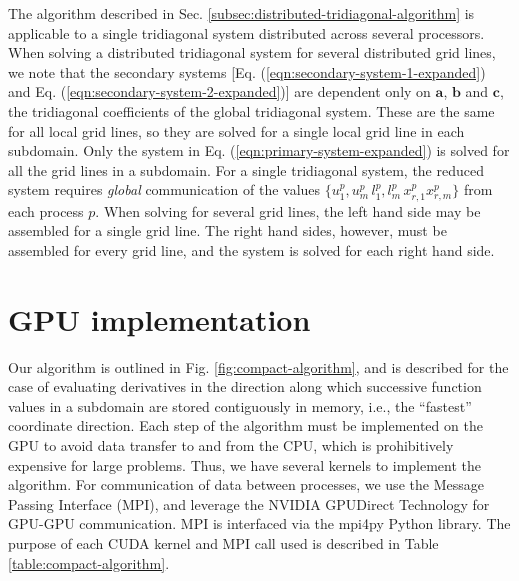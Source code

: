 The algorithm described in
Sec. \ref{subsec:distributed-tridiagonal-algorithm}
is applicable to a single tridiagonal system distributed
across several processors.
When solving a distributed tridiagonal system
for several distributed grid lines,
we note that
the secondary systems
[Eq. (\ref{eqn:secondary-system-1-expanded}) and
 Eq. (\ref{eqn:secondary-system-2-expanded})]
are dependent only on $\bm{a}$, $\bm{b}$ and $\bm{c}$,
the tridiagonal coefficients of the global tridiagonal system.
These are the same for all local grid lines,
so they are solved for a single local grid line in each subdomain.
Only the system in Eq. (\ref{eqn:primary-system-expanded})
is solved for all the grid lines in a subdomain.
For a single tridiagonal system,
the reduced system requires \emph{global} communication
of the values $\{u^p_1, u^p_m\, l^p_1, l^p_m\, x^p_{r,1} x^p_{r,m}\}$
from each process $p$.
When solving for several grid lines,
the left hand side may be assembled for a single grid line.
The right hand sides, however, must be assembled for every grid line,
and the system is solved for each right hand side.

\section{GPU implementation}

Our algorithm is outlined in Fig. \ref{fig:compact-algorithm},
and is described for the case of evaluating derivatives
in the direction along which successive
function values in a subdomain are stored contiguously in memory,
i.e., the ``fastest'' coordinate direction.
Each step of the algorithm must be implemented on the GPU
to avoid data transfer to and from the CPU,
which is prohibitively expensive for large problems.
Thus, we have several kernels to implement the algorithm.
For communication of data between processes,
we use the Message Passing Interface (MPI),
and leverage the NVIDIA GPUDirect Technology
for GPU-GPU communication.
MPI is interfaced via the mpi4py \cite{dalcin2005mpi}
Python library.
The purpose of each CUDA kernel and MPI call used
is described in Table \ref{table:compact-algorithm}.

